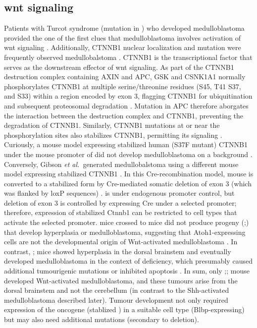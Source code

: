 \subsection{\gls{wnt} signaling}

Patients with Turcot syndrome (mutation in ) who developed medulloblastoma provided the one of the first clues that medulloblastoma involves activation of \gls{wnt} signaling . Additionally, CTNNB1 nuclear localization and  mutation were frequently observed medullobalstoma . CTNNB1 is the transcriptional factor that serves as the downstream effector of \gls{wnt} signaling. As part of the CTNNB1 destruction complex containing AXIN and APC, GSK and CSNK1A1 normally phosphorylates CTNNB1 at multiple serine/threonine residues (S45, T41 S37, and S33) within a region encoded by exon 3, flagging CTNNB1 for ubiquitination and subsequent proteosomal degradation . Mutation in APC therefore aborgates the interaction between the destruction complex and CTNNB1, preventing the degradation of CTNNB1. Similarly, CTNNB1 mutations at or near the phosphorylation sites also stabilizes CTNNB1, permitting its signaling . Curiously, a mouse model expressing stabilized human (S37F mutant) CTNNB1 under the mouse promoter of  did not develop medulloblastoma on a \high{-/-} background . Conversely, Gibson \emph{et al.}\ generated medullobalstoma using a different mouse model expressing stabilized CTNNB1 . In this Cre-recombination model, mouse  is converted to a stabilized form by Cre-mediated somatic deletion of exon 3 (which was flanked by loxP sequences) .  is under endogenous promoter control, but deletion of exon 3 is controlled by expressing Cre under a selected promoter; therefore, expression of stabilized Ctnnb1 can be restricted to cell types that activate the selected promoter.   mice crossed to  mice did not produce progeny (;) that develop hyperplasia or medulloblastoma, suggesting that Atoh1-expressing cells are not the developmental origin of Wnt-activated medulloblastoma . In contrast, ; mice showed hyperplasia in the dorsal brainstem and eventually developed medulloblastoma in the context of  deficiency, which presumably caused additional tumourigenic mutations or inhibited apoptosis . In sum, only ;; mouse developed Wnt-activated medulloblastoma, and these tumours arise from the dorsal brainstem and not the cerebellum (in contrast to the Shh-activated medulloblastoma described later). Tumour development not only required expression of the oncogene (stablized ) in a suitable cell type (Blbp-expressing) but may also need additional mutations (secondary to  deletion).


